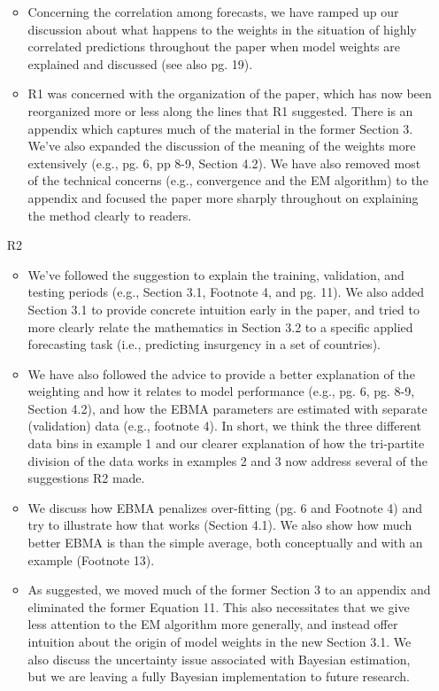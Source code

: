 \documentclass[10pt]{article}
\begin{document}
\begin{itemize}
\begin{itemize}
\item Concerning the correlation among forecasts, we have ramped up our discussion about what happens to the weights in the situation of highly correlated predictions throughout the paper when model weights are explained and discussed (see also pg. 19).
\item R1 was concerned with the organization of the paper, which has now been reorganized more or less along the lines that R1 suggested. There is an appendix which captures much of the material in the former Section 3. We've also expanded the discussion of the meaning of the weights more extensively (e.g., pg. 6,  pp 8-9, Section 4.2).  We have also removed most of the technical concerns (e.g., convergence and the EM algorithm) to the appendix and focused the paper more sharply throughout on explaining the method clearly to readers.
\end{itemize}

\item[R2]
\begin{itemize}
\item We've followed the suggestion to explain the training, validation, and testing periods (e.g., Section 3.1, Footnote 4, and pg. 11).  We also added Section 3.1 to provide concrete intuition early in the paper, and tried to more clearly relate the mathematics in Section 3.2 to a specific applied forecasting task (i.e., predicting insurgency in a set of countries).  
\item  We have also followed the advice to provide a better explanation of the weighting and how it relates to model performance (e.g., pg. 6,  pg. 8-9, Section 4.2),  and how the EBMA parameters are estimated with separate (validation) data (e.g., footnote 4).  In short, we think the three different data bins in example 1 and our clearer explanation of how the tri-partite division of the data works in examples 2 and 3 now address several of the suggestions R2 made. 
\item We discuss how EBMA penalizes over-fitting (pg. 6 and Footnote 4) and try to illustrate how that works (Section 4.1).  We also show how much better EBMA is than the simple average, both conceptually and with an example (Footnote 13).
\item As suggested, we moved much of the former Section 3 to an appendix and eliminated the former Equation 11.  This also necessitates that we give less attention to the EM algorithm more generally, and instead offer intuition about the origin of model weights in the new Section 3.1. We also discuss the uncertainty issue associated with Bayesian estimation, but we are leaving a fully Bayesian implementation to future research.
\end{itemize}


\end{itemize}
\end{document}
